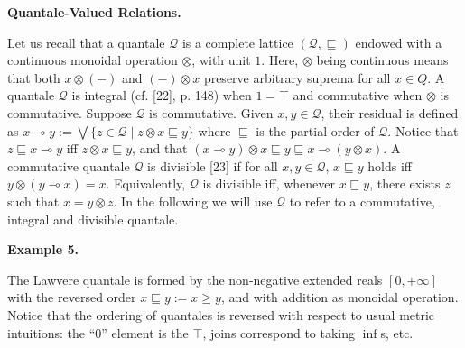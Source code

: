  
 
\par\medskip\noindent\textbf{Quantale-Valued Relations.}\par
 
 
Let us recall that a quantale $\mathcal{Q}$ is a complete lattice $(\mathcal{Q},\sqsubseteq)$ endowed with a continuous monoidal operation $\otimes$, with unit $1$. Here, $\otimes$ being continuous means that both $x\otimes(-)$ and $(-)\otimes x$ preserve arbitrary suprema for all $x\in Q$. A quantale $\mathcal{Q}$ is integral (cf. [22], p. 148) when $1=\top$ and commutative when $\otimes$ is commutative. Suppose $\mathcal{Q}$ is commutative. Given $x,y\in\mathcal{Q}$, their residual is defined as $x\multimap y:=\bigvee\{z\in\mathcal{Q}\mid z\otimes x\sqsubseteq y\}$ where $\sqsubseteq$ is the partial order of $\mathcal{Q}$. Notice that $z\sqsubseteq x\multimap y$ iff $z\otimes x\sqsubseteq y$, and that $(x\multimap y)\otimes x\sqsubseteq y\sqsubseteq x\multimap(y\otimes x)$. A commutative quantale $\mathcal{Q}$ is divisible [23] if for all $x,y\in\mathcal{Q}$, $x\sqsubseteq y$ holds iff $y\otimes(y\multimap x)=x$. Equivalently, $\mathcal{Q}$ is divisible iff, whenever $x\sqsubseteq y$, there exists $z$ such that $x=y\otimes z$. In the following we will use $\mathcal{Q}$ to refer to a commutative, integral and divisible quantale.\par
 
 
 
\par\medskip\noindent\textbf{Example 5.}\par
 
 
The Lawvere quantale is formed by the non-negative extended reals $[0,+\infty]$ with the reversed order $x\sqsubseteq y:=x\geq y$, and with addition as monoidal operation. Notice that the ordering of quantales is reversed with respect to usual metric intuitions: the “$0$” element is the $\top$, joins correspond to taking $\inf$s, etc.\par
 
 
 
 
